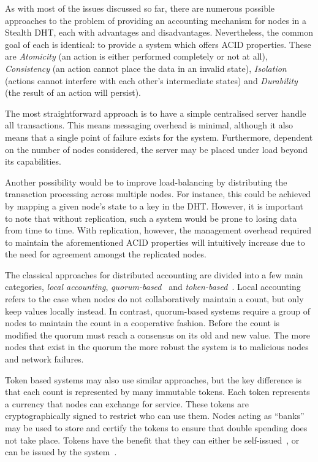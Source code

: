 \documentclass{elsart3p}
\begin{document}
As with most of the issues discussed so far, there are numerous
possible approaches to the problem of providing an accounting
mechanism for nodes in a Stealth DHT, each with advantages and
disadvantages. Nevertheless, the common goal of each is identical:
to provide a system which offers ACID properties. These are
\emph{Atomicity} (an action is either performed completely or not at
all), \emph{Consistency} (an action cannot place the data in an
invalid state), \emph{Isolation} (actions cannot interfere with each
other's intermediate states) and \emph{Durability} (the result of an
action will persist).

The most straightforward approach is to have a simple
centralised server handle all transactions. This means messaging
overhead is minimal, although it also means that a single point of
failure exists for the system. Furthermore, dependent on the number
of nodes considered, the server may be placed under load beyond its
capabilities.

Another possibility would be to improve load-balancing by
distributing the transaction processing across multiple nodes. For
instance, this could be achieved by mapping a given node's state to
a key in the DHT. However, it is important to note that without
replication, such a system would be prone to losing data from time
to time. With replication, however, the management overhead required
to maintain the aforementioned ACID properties will intuitively
increase due to the need for agreement amongst the replicated nodes.

The classical approaches for distributed accounting are divided into
a few main categories, \emph{local accounting},
\emph{quorum-based}~\cite{Castro99Practical} and
\emph{token-based}~\cite{Liebau04Token,Thigpen02Distributed,Rivest96PayWord}.
Local accounting refers to the case when nodes do not
collaboratively maintain a count, but only keep values locally
instead. In contrast, quorum-based systems require a group of nodes
to maintain the count in a cooperative fashion. Before the count is
modified the quorum must reach a consensus on its old and new value.
The more nodes that exist in the quorum the more robust the system
is to malicious nodes and network failures.

Token based systems may also use similar approaches, but the key
difference is that each count is represented by many immutable
tokens. Each token represents a currency that nodes can exchange for
service. These tokens are cryptographically signed to restrict who
can use them. Nodes acting as ``banks'' may be used to store and
certify the tokens to ensure that double spending does not take
place. Tokens have the benefit that they can either be
self-issued~\cite{Thigpen02Distributed}, or can be issued by the
system~\cite{Rivest96PayWord}.
\end{document}
